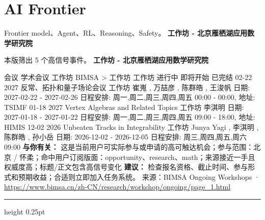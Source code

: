 \documentclass[10.5pt]{ctexart}
\begin{document}
\section*{AI Frontier}
{\color{ormuted} Frontier model、Agent、RL、Reasoning、Safety。}
\vspace{2mm}
{\LARGE\bfseries 工作坊 - 北京雁栖湖应用数学研究院}\par
\vspace{1mm}
{\color{ormuted} 本版筛出 5 个高信号事件。}
\vspace{3mm}
{\Large\bfseries 工作坊 - 北京雁栖湖应用数学研究院}\par
会议 学术会议 工作坊 BIMSA > 工作坊 工作坊 进行中 即将开始 已完结 02-22 2027 反常、拓扑和量子场论会议 工作坊 崔嵬 , 万喆彦 , 陈群皓 , 王浚帆 日期: 2027-02-22 - 2027-02-26 日程安排: 周一,周二,周三,周四,周五 00:00 - 00:00, 地址: TSIMF 01-18 2027 Vertex Algebras and Related Topics 工作坊 李淇明 日期: 2027-01-18 - 2027-01-22 日程安排: 周一,周二,周三,周四,周五 09:00 - 18:00, 地址: HIMIS 12-02 2026 Unbeaten Tracks in Integrability 工作坊 Junya Yagi , 李淇明 , 陈群皓 , 孙小岳 日期: 2026-12-02 - 2026-12-05 日程安排: 周三,周四,周五,周六 09:00
\textbf{与你有关：} 这是当前用户可实际参与或申请的高可触达机会；参与范围：北京 / 怀柔；命中用户订阅版面：opportunity、research、math；来源接近一手且权威度高；标题/正文包含高信号变化
\textbf{建议：} 检查报名资格、截止时间、参与形式和预期收益；合适则立即加入任务系统。
{\footnotesize\color{ormuted} 来源：BIMSA Ongoing Workshops · \url{https://www.bimsa.cn/zh-CN/research/workshop/ongoing/page_1.html}}
\vspace{4mm}
\hrule height 0.25pt
\vspace{3mm}
\end{document}
